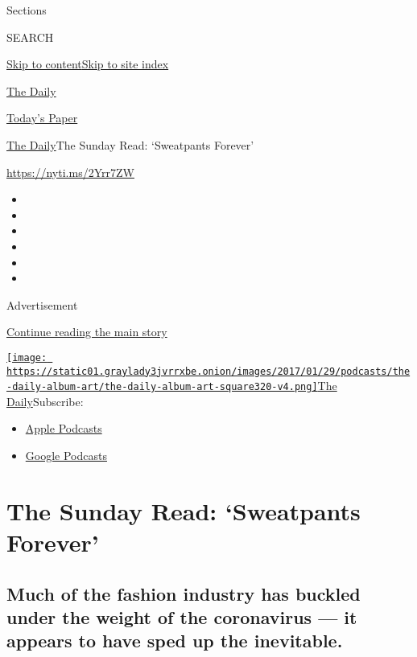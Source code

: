 Sections

SEARCH

\protect\hyperlink{site-content}{Skip to
content}\protect\hyperlink{site-index}{Skip to site index}

\href{https://www.nytimes3xbfgragh.onion/podcasts/the-daily}{The Daily}

\href{https://myaccount.nytimes3xbfgragh.onion/auth/login?response_type=cookie\&client_id=vi}{}

\href{https://www.nytimes3xbfgragh.onion/section/todayspaper}{Today's
Paper}

\href{/podcasts/the-daily}{The Daily}\textbar{}The Sunday Read:
`Sweatpants Forever'

\url{https://nyti.ms/2Yrr7ZW}

\begin{itemize}
\item
\item
\item
\item
\item
\item
\end{itemize}

Advertisement

\protect\hyperlink{after-top}{Continue reading the main story}

\href{https://www.nytimes3xbfgragh.onion/column/the-daily}{\texttt{[image: https://static01.graylady3jvrrxbe.onion/images/2017/01/29/podcasts/the-daily-album-art/the-daily-album-art-square320-v4.png]}The
Daily}Subscribe:

\begin{itemize}
\tightlist
\item
  \href{https://itunes.apple.com/us/podcast/id1200361736}{Apple
  Podcasts}
\item
  \href{https://www.google.com/podcasts?feed=aHR0cHM6Ly9yc3MuYXJ0MTkuY29tL3RoZS1kYWlseQ\%3D\%3D}{Google
  Podcasts}
\end{itemize}

\hypertarget{the-sunday-read-sweatpants-forever}{%
\section{The Sunday Read: `Sweatpants
Forever'}\label{the-sunday-read-sweatpants-forever}}

\hypertarget{much-of-the-fashion-industry-has-buckled-under-the-weight-of-the-coronavirus--it-appears-to-have-sped-up-the-inevitable}{%
\subsection{Much of the fashion industry has buckled under the weight of
the coronavirus --- it appears to have sped up the
inevitable.}\label{much-of-the-fashion-industry-has-buckled-under-the-weight-of-the-coronavirus--it-appears-to-have-sped-up-the-inevitable}}

